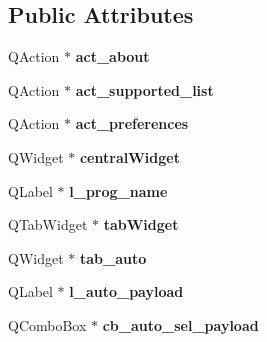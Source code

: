\subsection*{Public Attributes}
\begin{DoxyCompactItemize}
\item 
\hypertarget{classUi__MainWindow_aab4b28ba129cf41b95caced7769f1069}{Q\-Action $\ast$ {\bfseries act\-\_\-about}}\label{classUi__MainWindow_aab4b28ba129cf41b95caced7769f1069}

\item 
\hypertarget{classUi__MainWindow_a907125233437d6db0cc0473193058912}{Q\-Action $\ast$ {\bfseries act\-\_\-supported\-\_\-list}}\label{classUi__MainWindow_a907125233437d6db0cc0473193058912}

\item 
\hypertarget{classUi__MainWindow_ae77f9aab6b3f14a8c32153888e45cc7d}{Q\-Action $\ast$ {\bfseries act\-\_\-preferences}}\label{classUi__MainWindow_ae77f9aab6b3f14a8c32153888e45cc7d}

\item 
\hypertarget{classUi__MainWindow_a30075506c2116c3ed4ff25e07ae75f81}{Q\-Widget $\ast$ {\bfseries central\-Widget}}\label{classUi__MainWindow_a30075506c2116c3ed4ff25e07ae75f81}

\item 
\hypertarget{classUi__MainWindow_aaca249d901914381e98dd2b7910086ab}{Q\-Label $\ast$ {\bfseries l\-\_\-prog\-\_\-name}}\label{classUi__MainWindow_aaca249d901914381e98dd2b7910086ab}

\item 
\hypertarget{classUi__MainWindow_a3260b943854b841c986f47c4726ee7f9}{Q\-Tab\-Widget $\ast$ {\bfseries tab\-Widget}}\label{classUi__MainWindow_a3260b943854b841c986f47c4726ee7f9}

\item 
\hypertarget{classUi__MainWindow_a9262538a700c6a9c0ead582913a05540}{Q\-Widget $\ast$ {\bfseries tab\-\_\-auto}}\label{classUi__MainWindow_a9262538a700c6a9c0ead582913a05540}

\item 
\hypertarget{classUi__MainWindow_a51ae27370c9f75439dc9b9e89983c3de}{Q\-Label $\ast$ {\bfseries l\-\_\-auto\-\_\-payload}}\label{classUi__MainWindow_a51ae27370c9f75439dc9b9e89983c3de}

\item 
\hypertarget{classUi__MainWindow_a620f01689f782082eac85ca17ead4ce4}{Q\-Combo\-Box $\ast$ {\bfseries cb\-\_\-auto\-\_\-sel\-\_\-payload}}\label{classUi__MainWindow_a620f01689f782082eac85ca17ead4ce4}


\end{DoxyCompactItemize}
